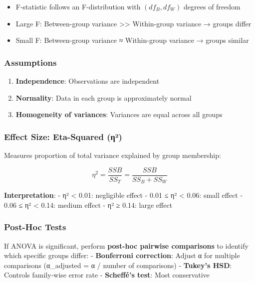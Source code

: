 \documentclass[11pt]{article}
\providecommand{\tightlist}{%
      \setlength{\itemsep}{0pt}\setlength{\parskip}{0pt}}
\begin{document}
\begin{itemize}
\tightlist
\item
  F-statistic follows an F-distribution with \((df_B, df_W)\) degrees of
  freedom
\item
  Large F: Between-group variance \textgreater\textgreater{}
  Within-group variance → groups differ
\item
  Small F: Between-group variance ≈ Within-group variance → groups
  similar
\end{itemize}

\subsubsection{Assumptions}\label{assumptions}

\begin{enumerate}
\def\labelenumi{\arabic{enumi}.}
\tightlist
\item
  \textbf{Independence}: Observations are independent
\item
  \textbf{Normality}: Data in each group is approximately normal
\item
  \textbf{Homogeneity of variances}: Variances are equal across all
  groups
\end{enumerate}

\subsubsection{Effect Size: Eta-Squared
(η²)}\label{effect-size-eta-squared-ux3b7uxb2}

Measures proportion of total variance explained by group membership:

\[\eta^2 = \frac{SSB}{SS_T} = \frac{SSB}{SS_B + SS_W}\]

\textbf{Interpretation}: - η² \textless{} 0.01: negligible effect - 0.01
≤ η² \textless{} 0.06: small effect - 0.06 ≤ η² \textless{} 0.14: medium
effect - η² ≥ 0.14: large effect

\subsubsection{Post-Hoc Tests}\label{post-hoc-tests}

If ANOVA is significant, perform \textbf{post-hoc pairwise comparisons}
to identify which specific groups differ: - \textbf{Bonferroni
correction}: Adjust α for multiple comparisons (α\_adjusted = α / number
of comparisons) - \textbf{Tukey's HSD}: Controls family-wise error rate
- \textbf{Scheffé's test}: Most conservative
\end{document}
